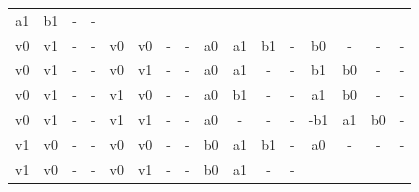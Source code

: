 \begin{table}[H]
{\begin{minipage}{\textwidth}
\begin{tabular}{cccccccccccccccc}
		\multicolumn{1}{c}{a1} &
		\multicolumn{1}{c}{b1} &
		\multicolumn{1}{c}{-}&
		\multicolumn{1}{c}{-} \\
		\multicolumn{1}{c}{v0} & \multicolumn{1}{c}{v1} & \multicolumn{1}{c}{-} & \multicolumn{1}{c}{-} &
		\multicolumn{1}{c}{v0} & \multicolumn{1}{c}{v0} & \multicolumn{1}{c}{-} & \multicolumn{1}{c}{-} &
		\multicolumn{1}{|c}{a0} & \multicolumn{1}{c}{a1} & \multicolumn{1}{c}{b1}& \multicolumn{1}{c}{-} &
		\multicolumn{1}{c}{b0} &
		\multicolumn{1}{c}{-} &
		\multicolumn{1}{c}{-}&
		\multicolumn{1}{c}{-} \\
		\multicolumn{1}{c}{v0} & \multicolumn{1}{c}{v1} & \multicolumn{1}{c}{-} & \multicolumn{1}{c}{-} &
		\multicolumn{1}{c}{v0} & \multicolumn{1}{c}{v1} & \multicolumn{1}{c}{-} & \multicolumn{1}{c}{-} &
		\multicolumn{1}{|c}{a0} & \multicolumn{1}{c}{a1} & \multicolumn{1}{c}{-}& \multicolumn{1}{c}{-} &
		\multicolumn{1}{c}{b1} &
		\multicolumn{1}{c}{b0} &
		\multicolumn{1}{c}{-}&
		\multicolumn{1}{c}{-} \\
		\multicolumn{1}{c}{v0} & \multicolumn{1}{c}{v1} & \multicolumn{1}{c}{-} & \multicolumn{1}{c}{-} &
		\multicolumn{1}{c}{v1} & \multicolumn{1}{c}{v0} & \multicolumn{1}{c}{-} & \multicolumn{1}{c}{-} &
		\multicolumn{1}{|c}{a0} & \multicolumn{1}{c}{b1} & \multicolumn{1}{c}{-}& \multicolumn{1}{c}{-} &
		\multicolumn{1}{c}{a1} &
		\multicolumn{1}{c}{b0} &
		\multicolumn{1}{c}{-}&
		\multicolumn{1}{c}{-} \\
		\multicolumn{1}{c}{v0} & \multicolumn{1}{c}{v1} & \multicolumn{1}{c}{-} & \multicolumn{1}{c}{-} &
		\multicolumn{1}{c}{v1} & \multicolumn{1}{c}{v1} & \multicolumn{1}{c}{-} & \multicolumn{1}{c}{-} &
		\multicolumn{1}{|c}{a0} & \multicolumn{1}{c}{-} & \multicolumn{1}{c}{-}& \multicolumn{1}{c}{-} &
		\multicolumn{1}{c}{-b1} &
		\multicolumn{1}{c}{a1} &
		\multicolumn{1}{c}{b0}&
		\multicolumn{1}{c}{-} \\
		\multicolumn{1}{c}{v1} & \multicolumn{1}{c}{v0} & \multicolumn{1}{c}{-} & \multicolumn{1}{c}{-} &
		\multicolumn{1}{c}{v0} & \multicolumn{1}{c}{v0} & \multicolumn{1}{c}{-} & \multicolumn{1}{c}{-} &
		\multicolumn{1}{|c}{b0} & \multicolumn{1}{c}{a1} & \multicolumn{1}{c}{b1}& \multicolumn{1}{c}{-} &
		\multicolumn{1}{c}{a0} &
		\multicolumn{1}{c}{-} &
		\multicolumn{1}{c}{-}&
		\multicolumn{1}{c}{-} \\
		\multicolumn{1}{c}{v1} & \multicolumn{1}{c}{v0} & \multicolumn{1}{c}{-} & \multicolumn{1}{c}{-} &
		\multicolumn{1}{c}{v0} & \multicolumn{1}{c}{v1} & \multicolumn{1}{c}{-} & \multicolumn{1}{c}{-} &
		\multicolumn{1}{|c}{b0} & \multicolumn{1}{c}{a1} & \multicolumn{1}{c}{-}& \multicolumn{1}{c}{-} &

\end{tabular}
\end{minipage}}
\end{table}
